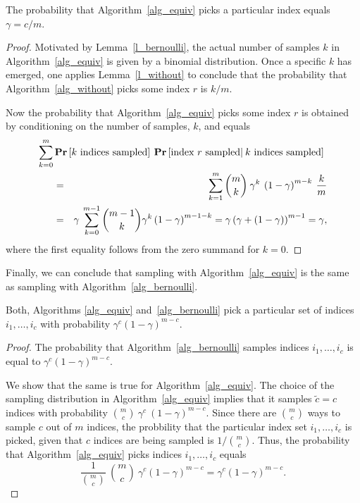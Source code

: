 \documentclass{siamltex}
\begin{document}
\begin{lemma}
The probability that Algorithm~\ref{alg_equiv} picks a particular
index equals $\gamma=c/m$.
\end{lemma}

\begin{proof}
Motivated by Lemma~\ref{l_bernoulli},
the actual number of samples $k$ in Algorithm~\ref{alg_equiv} 
is given by a binomial distribution. Once a specific $k$ has emerged,
one applies Lemma~\ref{l_without} to conclude that the probability that
Algorithm~\ref{alg_without} picks some index $r$ is $k/m$.

Now the probability that Algorithm~\ref{alg_equiv} picks some index $r$
is obtained by conditioning \cite[Section 3.5]{Ross}
on the number of samples, $k$, and equals
\begin{eqnarray*}
\lefteqn{\sum_{k=0}^m{{\mathbf{Pr}}\left[\text{$k$ indices sampled}\right]\>
{\mathbf{Pr}}\left[\text{index $r$ sampled} {\large{|}}\> 
\text{$k$ indices sampled}\right]}}\hspace{15pt}\\
& = &\sum_{k=1}^m{\binom{m}{k}\>\gamma^k\>\left(1-\gamma\right)^{m-k}
\>\frac{k}{m}}\\
& = &\gamma\>
\sum_{k=0}^{m-1}{\binom{m-1}{k}\gamma^{k}\left(1-\gamma\right)^{m-1-k}}
=\gamma\left(\gamma + (1-\gamma)\right)^{m-1}=\gamma,
\end{eqnarray*}
where the first equality follows from the zero summand for $k=0$.
\end{proof}

Finally, we can conclude that sampling with Algorithm~\ref{alg_equiv} is the 
same as sampling with Algorithm~\ref{alg_bernoulli}.

\begin{theorem}
Both,  Algorithms \ref{alg_equiv} and~\ref{alg_bernoulli} 
pick a particular set of indices $i_1, \ldots, i_c$ 
with probability $\gamma^c(1-\gamma)^{m-c}$.
\end{theorem}

\begin{proof}
The probability that Algorithm~\ref{alg_bernoulli} samples 
indices
$i_1, \ldots, i_c$ is equal to  $\gamma^c(1-\gamma)^{m-c}$.  

We show that the same is true for Algorithm~\ref{alg_equiv}.  
The choice of the sampling distribution in 
Algorithm~\ref{alg_equiv} implies that it samples $\tilde{c}=c$
indices with
probability $\binom{m}{c}\>\gamma^c\>(1-\gamma)^{m-c}$.
Since there are $\binom{m}{c}$ ways to sample $c$ out of $m$ indices, 
the probbility that the particular index set $i_1, \ldots, i_c$ 
is picked, given that $c$
indices are being sampled is $1/\binom{m}{c}$.  Thus, the probability that
Algorithm~\ref{alg_equiv} picks indices $i_1, \ldots, i_c$ equals
$$\frac{1}{\binom{m}{c}}\>
\binom{m}{c}\>\gamma^c(1-\gamma)^{m-c} = \gamma^c(1-\gamma)^{m-c}.$$
\end{proof}
\end{document}
